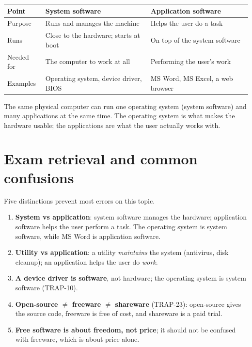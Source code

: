 \documentclass[11pt]{article}
\begin{document}
\begin{center}
\begin{tabular}{p{}p{}p{}}
\toprule
\textbf{Point} & \textbf{System software} & \textbf{Application software} \\
\midrule
Purpose & Runs and manages the machine & Helps the user do a task \\
Runs & Close to the hardware; starts at boot & On top of the system software \\
Needed for & The computer to work at all & Performing the user's work \\
Examples & Operating system, device driver, BIOS & MS Word, MS Excel, a web browser \\
\bottomrule
\end{tabular}
\end{center}

The same physical computer can run one operating system (system software) and
many applications at the same time. The operating system is what makes the
hardware usable; the applications are what the user actually works with.

\section{Exam retrieval and common confusions}
Five distinctions prevent most errors on this topic.
\begin{enumerate}
  \item \textbf{System vs application}: system software manages the hardware;
    application software helps the user perform a task. The operating system
    is system software, while MS Word is application software.
  \item \textbf{Utility vs application}: a utility \emph{maintains} the system
    (antivirus, disk cleanup); an application helps the user do \emph{work}.
  \item \textbf{A device driver is software}, not hardware; the operating
    system is system software (TRAP-10).
  \item \textbf{Open-source $\neq$ freeware $\neq$ shareware} (TRAP-23):
    open-source gives the source code, freeware is free of cost, and shareware
    is a paid trial.
  \item \textbf{Free software is about freedom, not price}; it should not be
    confused with freeware, which is about price alone.
\end{enumerate}
\end{document}
